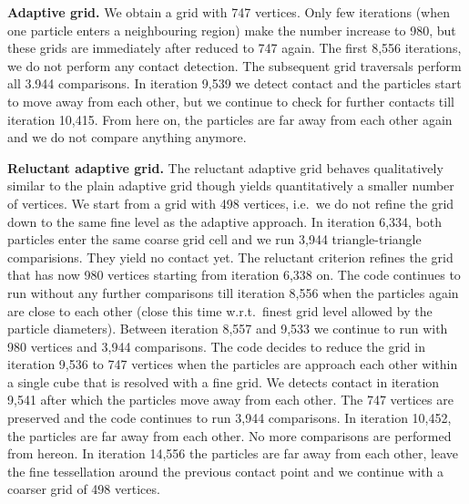 {\bf Adaptive grid.} We obtain a grid with 747 vertices. Only few iterations
(when one particle enters a neighbouring region) make the number increase to
980, but these grids are immediately after reduced to 747 again.
The first 8,556 iterations, we do not perform any contact detection. The
subsequent grid traversals perform all 3.944 comparisons.
In iteration 9,539 we detect contact and the particles start to move away
from each other, but we continue to check for further contacts till iteration
10,415.
From here on, the particles are far away from each other again
and we do not compare anything anymore.



{\bf Reluctant adaptive grid.} The reluctant adaptive grid behaves qualitatively
similar to the plain adaptive grid though yields quantitatively a smaller number
of vertices. 
We start from a grid with 498 vertices, i.e.~we do not refine the grid down to
the same fine level as the adaptive approach.
In iteration 6,334, both particles enter the same coarse grid cell and we run
3,944 triangle-triangle comparisions. 
They yield no contact yet.
The reluctant criterion refines the grid that has now 980 vertices starting from
iteration 6,338 on.
The code continues to run without any further comparisons till iteration 8,556
when the particles again are close to each other (close this time w.r.t.~finest
grid level allowed by the particle diameters).
Between iteration 8,557 and 9,533 we continue to run with 980 vertices and
3,944 comparisons.
The code decides to reduce the grid in iteration 9,536 to 747 vertices when the
particles are approach each other within a single cube that is resolved with a
fine grid.
We detects contact in iteration 9,541 after which the particles move away from
each other.
The 747 vertices are preserved and the code continues to run 3,944 comparisons.
In iteration 10,452, the particles are far away from each other. 
No more comparisons are performed from hereon.
In iteration 14,556 the particles are far away from each other, leave the
fine tessellation around the previous contact point and we continue with a
coarser grid of 498 vertices.

